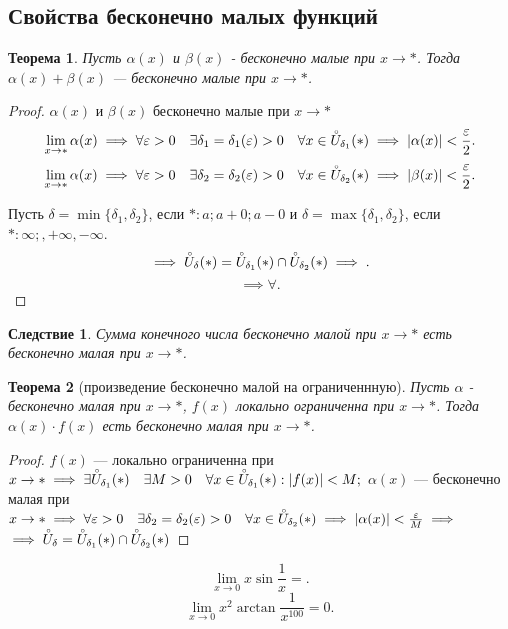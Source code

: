 \documentclass[a4paper,12pt]{article} %
\newtheorem{theorem}{Теорема}[subsection]
\newtheorem{corollary}{Следствие}[theorem]
\theoremstyle{remark}
\begin{document}
\subsection{Свойства бесконечно малых функций}
\begin{theorem}
	Пусть $\alpha(x)$ и  $\beta(x)$ - бесконечно малые при  $x\to *$. Тогда $\alpha(x) + \beta(x)$ --- бесконечно малые при  $x\to *$.
\end{theorem}
\begin{proof}
	$\alpha(x)$ и  $\beta(x)$ бесконечно малые при  $x\to *$ 
	\[
		\lim_{x \to *} \alpha(x) \implies \forall \varepsilon> 0 \quad \exists \delta_1=\delta_1(\varepsilon)>0 \quad \forall x\in \accentset {\circ}{U}_{\delta_1}(*) \implies |\alpha(x)| < \frac{\varepsilon}{2}	
	.\] 
	\[
		\lim_{x \to *} \alpha(x) \implies \forall \varepsilon> 0 \quad \exists \delta_2=\delta_2(\varepsilon)>0 \quad \forall x\in \accentset    {\circ}{U}_{\delta_2}(*) \implies |\beta(x)| < \frac{\varepsilon}{2}	
	.\] 

	Пусть $\delta = \min \{\delta_1, \delta_2\} $, если $*: a; a + 0; a - 0$ и  $\delta=\max \{\delta_1, \delta_2\} $, если $*: \infty;, +\infty, -\infty$.
	\[
		\implies \accentset{\circ}{U}_\delta(*) = \accentset{\circ}{U}_{\delta_1}(*) \cap \accentset{\circ}{U}_{\delta_2}(*) \implies
	.\] 
	\[
	\implies \forall 
	.\] 
	
\end{proof}

\begin{corollary}
Сумма конечного числа бесконечно малой при $x\to *$ есть бесконечно малая при $x \to  *$.
\end{corollary}

\begin{theorem}[произведение бесконечно малой на ограниченнную]
	Пусть $\alpha$ - бесконечно малая при $x \to *$, $f(x)$ локально ограниченна при  $x\to *$. Тогда $\alpha(x)\cdot f(x)$ есть бесконечно малая при $x\to *$.
\end{theorem}
	\begin{proof}
		$f(x)$ --- локально ограниченна при $x\to * \implies \exists \accentset{\circ}{U}_{\delta_1}(*) \quad \exists M>0 \quad \forall x \in  \accentset{\circ}{U}_{\delta_1}(*) : |f(x)| < M;$
		$\alpha(x)$ --- бесконечно малая при $x \to  * \implies \forall \varepsilon> 0 \quad \exists \delta_2=\delta_2(\varepsilon)>0 \quad \forall x\in \accentset    {\circ}{U}_{\delta_2}(*) \implies |\alpha(x)| < \frac{\varepsilon}{M} \implies$
		$\implies \accentset{\circ}{U}_\delta=\accentset{\circ}{U}_{\delta_1}(*)\cap \accentset{\circ}{U}_{\delta_2}(*)$

	\end{proof}
\[
	\lim_{x \to 0} x \sin{\frac{1}{x}} = 
.\] 
\[
	\lim_{x \to 0} x^2 \arctan{\frac{1}{x^{100}}} = 0
.\] 
\end{document}
